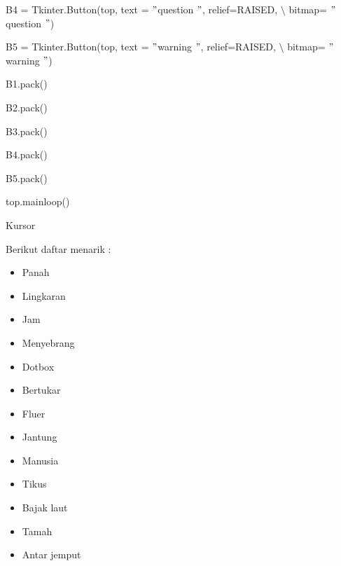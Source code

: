 \begin{itemize}
{\fontsize{10pt}{10pt}\selectfont B4 = Tkinter.Button(top, text = $ " $question $ " $, relief=RAISED,  $  \setminus  $ bitmap= $ " $question $ " $)} \par
{\fontsize{10pt}{10pt}\selectfont B5 = Tkinter.Button(top, text = $ " $warning $ " $, relief=RAISED,  $  \setminus  $ bitmap= $ " $warning $ " $)} \par
\vspace{10pt}
{\fontsize{10pt}{10pt}\selectfont B1.pack()} \par
{\fontsize{10pt}{10pt}\selectfont B2.pack()} \par
{\fontsize{10pt}{10pt}\selectfont B3.pack()} \par
{\fontsize{10pt}{10pt}\selectfont B4.pack()} \par
{\fontsize{10pt}{10pt}\selectfont B5.pack()} \par
{\fontsize{10pt}{10pt}\selectfont top.mainloop()} \par
\noindent 
Kursor \par
\noindent 
Berikut daftar menarik : \par
\noindent 
\begin{itemize}
\item Panah \par
\noindent 
\item Lingkaran \par
\noindent 
\item Jam \par
\noindent 
\item Menyebrang \par
\noindent 
\item Dotbox \par
\noindent 
\item Bertukar \par
\noindent 
\item Fluer \par
\noindent 
\item Jantung \par
\noindent 
\item Manusia \par
\noindent 
\item Tikus \par
\noindent 
\item Bajak laut \par
\noindent 
\item Tamah \par
\noindent 
\item Antar jemput \par

\end{itemize}
\end{itemize}
